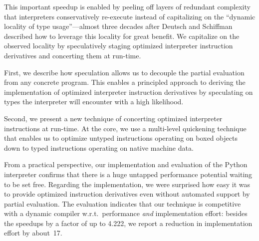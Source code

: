 \documentclass[preprint,10pt]{popl14conf}
\newcommand{\namasteMaxSU}{4.222}
\begin{document}
This important speedup is enabled by peeling off layers of redundant complexity that interpreters
conservatively re-execute instead of capitalizing on the ``dynamic locality of type usage''---almost
three decades after Deutsch and Schiffman described how to leverage this locality for great benefit.
We capitalize on the observed locality by speculatively staging optimized interpreter instruction
derivatives and concerting them at run-time.

First, we describe how speculation allows us to decouple the partial evaluation from any concrete
program.
This enables a principled approach to deriving the implementation of optimized interpreter
instruction derivatives by speculating on types the interpreter will encounter with a high
likelihood.

Second, we present a new technique of concerting optimized interpreter instructions at run-time.
At the core, we use a multi-level quickening technique that enables us to optimize untyped
instructions operating on boxed objects down to typed instructions operating on native machine
data.

From a practical perspective, our implementation and evaluation of the Python interpreter confirms
that there is a huge untapped performance potential waiting to be set free.
Regarding the implementation, we were surprised how easy it was to provide optimized instruction
derivatives even without automated support by partial evaluation.
The evaluation indicates that our technique is competitive with a dynamic compiler
w.r.t.~performance \emph{and} implementation effort: besides the speedups by a factor of up
to \namasteMaxSU{}, we report a reduction in implementation effort by about~17.











\end{document}
